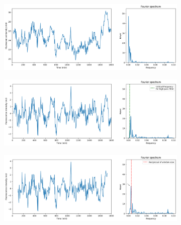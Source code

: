 
\begin{figure}
  \centering
  \begin{subfigure}[htpb]{0.8\textwidth}
   \centering
   \includegraphics[width=\textwidth]{fft_raw}
   \caption{
   }
   \label{fig:analysis-filter-raw}
  \end{subfigure}

  \begin{subfigure}[htpb]{0.8\textwidth}
   \centering
   \includegraphics[width=\textwidth]{fft_butterworth}
   \caption{
   }
   \label{fig:analysis-filter-butterworth}
  \end{subfigure}

  \begin{subfigure}[htpb]{0.8\textwidth}
   \centering
   \includegraphics[width=\textwidth]{fft_slidingwindow_edit}
   \caption{
   }
   \label{fig:analysis-filter-movavg}
  \end{subfigure}


\end{figure}
